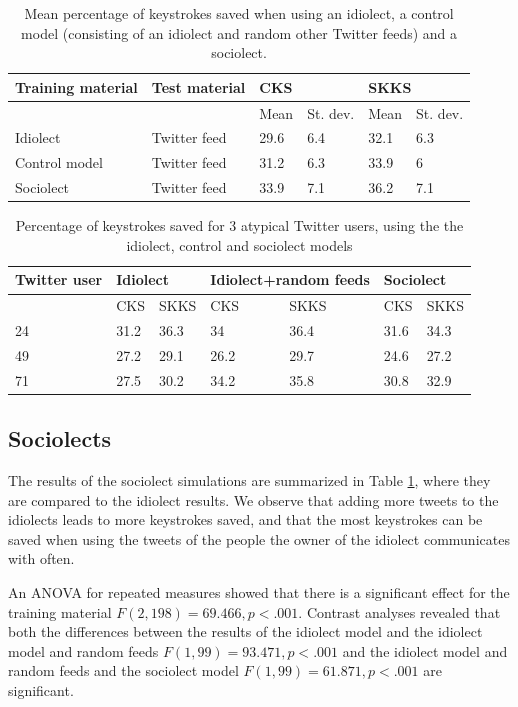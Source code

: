 \documentclass[12pt]{article}
\begin{document}
{\begin{table}[htb] 
\centering
\begin{tabular}{ll|llll} 
Training material&Test material&\multicolumn{2}{l}{CKS}&\multicolumn{2}{l}{SKKS}\\
\hline
&&Mean&St. dev.&Mean&St. dev.\\
Idiolect&Twitter feed&29.6&6.4&32.1&6.3\\
Control model&Twitter feed&31.2&6.3&33.9&6\\
Sociolect&Twitter feed&33.9&7.1&36.2&7.1\\
\end{tabular} 
\caption{Mean percentage of keystrokes saved when using an idiolect, a control model (consisting of an idiolect and random other Twitter feeds) and a sociolect.} \label{socio_results}
\end{table}

\begin{table}[htb] 
\centering
\begin{tabular}{l|llllll} 
Twitter user&\multicolumn{2}{l}{Idiolect}&\multicolumn{2}{l}{Idiolect+random feeds}&\multicolumn{2}{l}{Sociolect}\\
\hline
&CKS&SKKS&CKS&SKKS&CKS&SKKS\\
24&31.2&36.3&34&36.4&31.6&34.3\\
49&27.2&29.1&26.2&29.7&24.6&27.2\\
71&27.5&30.2&34.2&35.8&30.8&32.9\\
\end{tabular} 
\caption{Percentage of keystrokes saved for 3 atypical Twitter users, using the the idiolect, control and sociolect models}
\label{deviations}
\end{table}

\subsection{Sociolects}
The results of the sociolect simulations are summarized in Table \ref{socio_results}, where they are compared to the idiolect results. We observe that adding more tweets to the idiolects leads to more keystrokes saved, and that the most keystrokes can be saved when using the tweets of the people the owner of the idiolect communicates with often.

An ANOVA for repeated measures showed that there is a significant effect for the training material $F(2,198) = 69.466, p < .001$. Contrast analyses revealed that both the differences between the results of the idiolect model and the idiolect model and random feeds $F(1,99) = 93.471, p < .001$ and the idiolect model and random feeds and the sociolect model $F(1,99) = 61.871, p < .001$ are significant.

}
\end{document}
